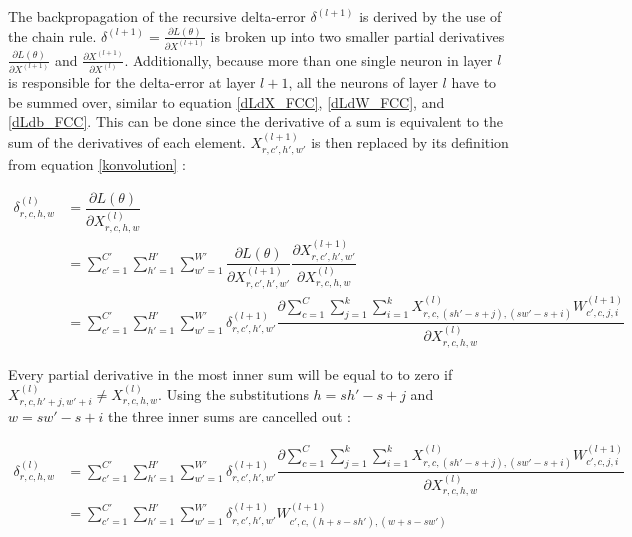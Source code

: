 \documentclass[a4paper, twoside]{article}
\newcommand*{\pd}[2]{\ensuremath{\dfrac{\partial #1}{\partial #2}}}
\newcommand*{\inpd}[2]{\ensuremath{\frac{\partial #1}{\partial #2}}}
\begin{document}
The backpropagation of the recursive delta-error $\delta^{(l+1)}$ is derived by the use of the chain rule. $\delta^{(l+1)} = \inpd{L(\theta)}{X^{(l+1)}}$ is broken up into two smaller partial derivatives $\inpd{L(\theta)}{X^{(l+1)}}$ and $\inpd{X^{(l+1)}}{X^{(l)}}$. Additionally, because more than one single neuron in layer $l$ is responsible for the delta-error at layer $l+1$, all the neurons of layer $l$ have to be summed over, similar to equation \eqref{dLdX_FCC}, \eqref{dLdW_FCC}, and \eqref{dLdb_FCC}. This can be done since the derivative of a sum is equivalent to the sum of the derivatives of each element. $X^{(l+1)}_{r,c',h',w'}$ is then replaced by its definition from equation \eqref{konvolution} \cite{convmath} \cite{webconv1} \cite{webconv2} \cite{webconv3}: 

\begin{equation}\label{konvolutionbackprop}
\begin{split}
	\delta^{(l)}_{r,c,h,w}
		& = \pd{L(\theta)}{X^{(l)}_{r,c,h,w}} \\
		& = \sum^{C' }_{c'=1} \sum^{H' }_{h'=1} \sum^{W' }_{w'=1} \pd{L(\theta)}{X^{(l+1)}_{r,c',h',w'}} \pd{X^{(l+1)}_{r,c',h',w'}}{X^{(l)}_{r,c,h,w}} \\
		& = \sum^{C' }_{c'=1} \sum^{H' }_{h'=1} \sum^{W' }_{w'=1} \delta^{(l+1)}_{r,c',h',w'} \pd{\sum^{C }_{c=1} \sum^{k}_{j=1} \sum^{k}_{i=1} X^{(l)}_{r, c, (sh'-s+j), (sw'-s+i)}W^{(l+1)}_{c', c, j, i}}{X^{(l)}_{r,c,h,w}}
\end{split}
\end{equation}

Every partial derivative in the most inner sum will be equal to to zero if $X^{(l)}_{r, c, h'+j, w'+i} \neq X^{(l)}_{r,c,h,w}$. Using the substitutions $h = sh'-s+j$ and $w = sw'-s+i$ the three inner sums are cancelled out \cite{webconv1} \cite{webconv2} \cite{webconv3}:

\begin{equation}
\begin{split}
	\delta^{(l)}_{r,c,h,w}
		& = \sum^{C' }_{c'=1} \sum^{H' }_{h'=1} \sum^{W' }_{w'=1} \delta^{(l+1)}_{r,c',h',w'} \pd{\sum^{C }_{c=1} \sum^{k }_{j=1} \sum^{k }_{i=1} X^{(l)}_{r, c, (sh'-s+j), (sw'-s+i)}W^{(l+1)}_{c', c, j, i}}{X^{(l)}_{r,c,h,w}} \\
		& = \sum^{C' }_{c'=1} \sum^{H' }_{h'=1} \sum^{W' }_{w'=1} \delta^{(l+1)}_{r,c',h',w'} W^{(l+1)}_{c', c, (h+s-sh'), (w+s-sw')}     \\
\end{split}
\end{equation}
\end{document}
